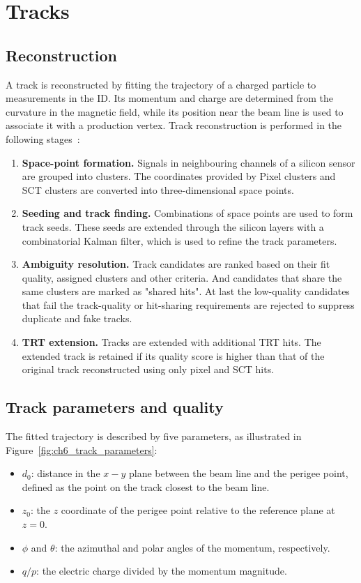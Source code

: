 \section{Tracks}
\label{sec:ch6_tracks}

\subsection{Reconstruction}

A track is reconstructed by fitting the trajectory of a charged particle to measurements in the ID.
Its momentum and charge are determined from the curvature in the magnetic field, while its position near the beam line is used to associate it with a production vertex.
Track reconstruction is performed in the following stages~\cite{ATLAS2017DenseTracking}:
\begin{enumerate}
    \item \textbf{Space-point formation.} Signals in neighbouring channels of a silicon sensor are grouped into clusters. The coordinates provided by Pixel clusters and SCT clusters are converted into three-dimensional space points.
    \item \textbf{Seeding and track finding.} Combinations of space points are used to form track seeds. These seeds are extended through the silicon layers with a combinatorial Kalman filter, which is used to refine the track parameters.
    \item \textbf{Ambiguity resolution.} Track candidates are ranked based on their fit quality, assigned clusters and other criteria. And candidates that share the same clusters are marked as "shared hits". At last the low-quality candidates that fail the track-quality or hit-sharing requirements are rejected to suppress duplicate and fake tracks.
    \item \textbf{TRT extension.} Tracks are extended with additional TRT hits. The extended track is retained if its quality score is higher than that of the original track reconstructed using only pixel and SCT hits.
\end{enumerate}

\subsection{Track parameters and quality}

The fitted trajectory is described by five parameters, as illustrated in Figure~\ref{fig:ch6_track_parameters}:
\begin{itemize}
    \item $d_0$: distance in the $x-y$ plane between the beam line and the perigee point, defined as the point on the track closest to the beam line.
    \item $z_0$: the $z$ coordinate of the perigee point relative to the reference plane at $z=0$.
    \item $\phi$ and $\theta$: the azimuthal and polar angles of the momentum, respectively.
    \item $q/p$: the electric charge divided by the momentum magnitude.
\end{itemize}

